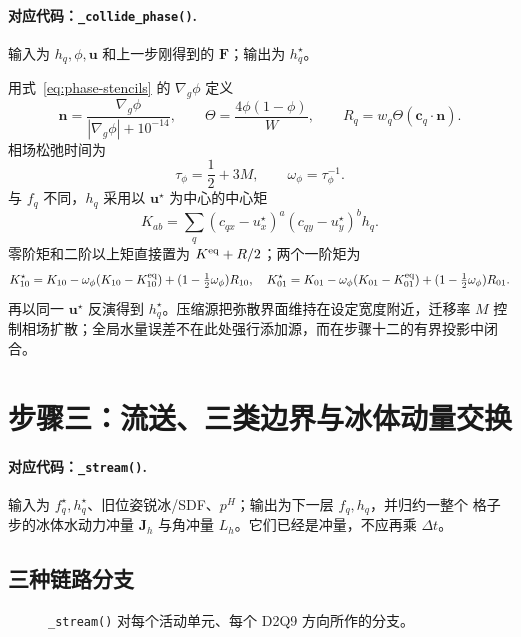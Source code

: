 \documentclass[UTF8,zihao=-4]{ctexart}
\newcommand{\vect}[1]{\boldsymbol{#1}}
\newcommand{\code}[1]{\texttt{#1}}
\newcommand{\stepname}[1]{\paragraph{对应代码：\code{#1}.}}
\numberwithin{equation}{section}
\begin{document}
\stepname{\_collide\_phase()}
输入为 $h_q,\phi,\vect u$ 和上一步刚得到的 $\vect F$；输出为 $h_q^\star$。

用式~\eqref{eq:phase-stencils} 的 $\nabla_g\phi$ 定义
\begin{equation}
  \vect n=\frac{\nabla_g\phi}{|\nabla_g\phi|+10^{-14}},
  \qquad \Theta=\frac{4\phi(1-\phi)}{W},
  \qquad R_q=w_q\Theta(\vect c_q\cdot\vect n).
  \label{eq:phase-compression-source}
\end{equation}
相场松弛时间为
\begin{equation}
  \tau_\phi=\frac12+3M,
  \qquad \omega_\phi=\tau_\phi^{-1}.
\end{equation}
与 $f_q$ 不同，$h_q$ 采用以 $\vect u^\star$ 为中心的中心矩
\begin{equation}
  K_{ab}=\sum_q(c_{qx}-u_x^\star)^a(c_{qy}-u_y^\star)^bh_q.
\end{equation}
零阶矩和二阶以上矩直接置为 $K^{\rm eq}+R/2$；两个一阶矩为
\begin{equation}
  K_{10}^\star=K_{10}-\omega_\phi(K_{10}-K_{10}^{\rm eq})
    +(1-\tfrac12\omega_\phi)R_{10},
  \quad
  K_{01}^\star=K_{01}-\omega_\phi(K_{01}-K_{01}^{\rm eq})
    +(1-\tfrac12\omega_\phi)R_{01}.
  \label{eq:phase-central-collision}
\end{equation}
再以同一 $\vect u^\star$ 反演得到 $h_q^\star$。压缩源把弥散界面维持在设定宽度附近，迁移率
$M$ 控制相场扩散；全局水量误差不在此处强行添加源，而在步骤十二的有界投影中闭合。

\section{步骤三：流送、三类边界与冰体动量交换}

\stepname{\_stream()}
输入为 $f_q^\star,h_q^\star$、旧位姿锐冰/SDF、$p^H$；输出为下一层 $f_q,h_q$，并归约一整个
格子步的冰体水动力冲量 $\vect J_h$ 与角冲量 $L_h$。它们已经是冲量，不应再乘 $\Delta t$。

\subsection{三种链路分支}

\begin{figure}[H]
\centering
{}
\caption{\code{\_stream()} 对每个活动单元、每个 D2Q9 方向所作的分支。}
\label{fig:stream-branches}
\end{figure}
\end{document}
